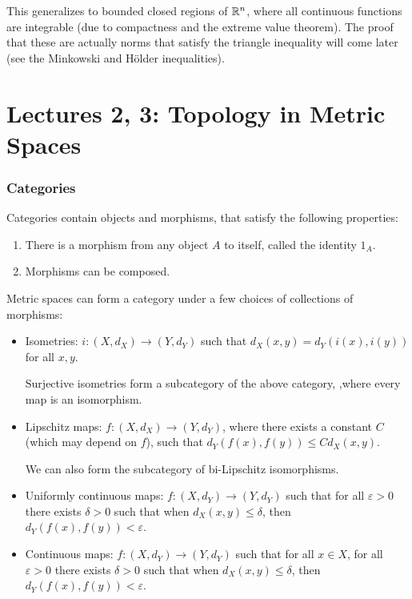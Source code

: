 This generalizes to bounded closed regions of $\mathbb R^n$, where all continuous functions are integrable (due to compactness and the extreme value theorem). The proof that these are actually norms that satisfy the triangle inequality will come later (see the Minkowski and H\"older inequalities).

\section{Lectures 2, 3: Topology in Metric Spaces}

\subsubsection*{Categories}

Categories contain objects and morphisms, that satisfy the following properties:
\begin{enumerate}
    \item There is a morphism from any object $A$ to itself, called the identity $1_A$.
    \item Morphisms can be composed.
\end{enumerate}

Metric spaces can form a category under a few choices of collections of morphisms:
\begin{itemize}
    \item Isometries: $i\colon (X, d_X) \to (Y, d_Y)$ such that $d_X(x, y) = d_Y(i(x), i(y))$ for all $x, y$.
    
    Surjective isometries form a subcategory of the above category, ,where every map is an isomorphism.
    \item Lipschitz maps: $f\colon (X, d_X) \to (Y, d_Y)$, where there exists a constant $C$ (which may depend on $f$), such that $d_Y(f(x), f(y)) \le Cd_X(x, y)$.
    
    We can also form the subcategory of bi-Lipschitz isomorphisms.
    
    \item Uniformly continuous maps: $f\colon (X, d_Y) \to (Y, d_Y)$ such that for all $\varepsilon > 0$ there exists $\delta > 0$ such that when $d_X(x, y) \le \delta$, then $d_Y(f(x), f(y)) < \varepsilon$.
    \item Continuous maps: $f\colon (X, d_Y) \to (Y, d_Y)$ such that for all $x \in X$, for all $\varepsilon > 0$ there exists $\delta > 0$ such that when $d_X(x, y) \le \delta$, then $d_Y(f(x), f(y)) < \varepsilon$.
\end{itemize}

